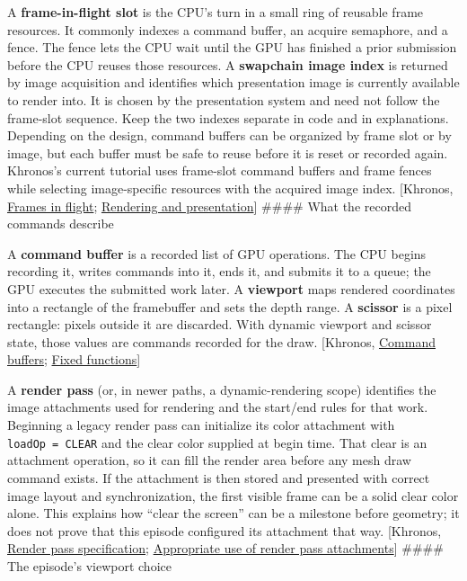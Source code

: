 A \textbf{frame-in-flight slot} is the CPU's turn in a small ring of reusable frame resources. It commonly indexes a command buffer, an acquire semaphore, and a fence. The fence lets the CPU wait until the GPU has finished a prior submission before the CPU reuses those resources. A \textbf{swapchain image index} is returned by image acquisition and identifies which presentation image is currently available to render into. It is chosen by the presentation system and need not follow the frame-slot sequence. Keep the two indexes separate in code and in explanations. Depending on the design, command buffers can be organized by frame slot or by image, but each buffer must be safe to reuse before it is reset or recorded again. Khronos's current tutorial uses frame-slot command buffers and frame fences while selecting image-specific resources with the acquired image index. {[}Khronos, \href{https://docs.vulkan.org/tutorial/latest/03_Drawing_a_triangle/03_Drawing/03_Frames_in_flight.html}{Frames in flight}; \href{https://docs.vulkan.org/tutorial/latest/03_Drawing_a_triangle/03_Drawing/02_Rendering_and_presentation.html}{Rendering and presentation}{]} \#\#\#\# What the recorded commands describe

A \textbf{command buffer} is a recorded list of GPU operations. The CPU begins recording it, writes commands into it, ends it, and submits it to a queue; the GPU executes the submitted work later. A \textbf{viewport} maps rendered coordinates into a rectangle of the framebuffer and sets the depth range. A \textbf{scissor} is a pixel rectangle: pixels outside it are discarded. With dynamic viewport and scissor state, those values are commands recorded for the draw. {[}Khronos, \href{https://docs.vulkan.org/tutorial/latest/03_Drawing_a_triangle/03_Drawing/01_Command_buffers.html}{Command buffers}; \href{https://docs.vulkan.org/tutorial/latest/03_Drawing_a_triangle/02_Graphics_pipeline_basics/02_Fixed_functions.html}{Fixed functions}{]}

A \textbf{render pass} (or, in newer paths, a dynamic-rendering scope) identifies the image attachments used for rendering and the start/end rules for that work. Beginning a legacy render pass can initialize its color attachment with \texttt{loadOp\ =\ CLEAR} and the clear color supplied at begin time. That clear is an attachment operation, so it can fill the render area before any mesh draw command exists. If the attachment is then stored and presented with correct image layout and synchronization, the first visible frame can be a solid clear color alone. This explains how ``clear the screen'' can be a milestone before geometry; it does not prove that this episode configured its attachment that way. {[}Khronos, \href{https://docs.vulkan.org/spec/latest/chapters/renderpass.html}{Render pass specification}; \href{https://docs.vulkan.org/samples/latest/samples/performance/render_passes/README.html}{Appropriate use of render pass attachments}{]} \#\#\#\# The episode's viewport choice

